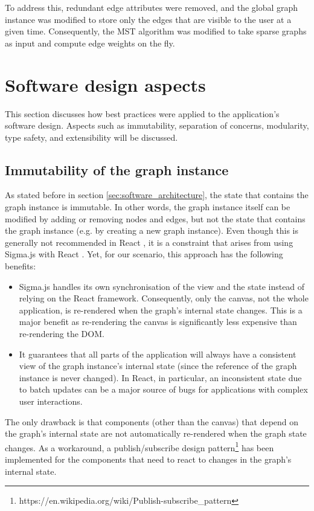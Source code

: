 \documentclass{l4proj}
\begin{document}
To address this, redundant edge attributes were removed, and the global graph instance was modified to store only the edges that are visible to the user at a given time.
Consequently, the MST algorithm was modified to take sparse graphs as input and compute edge weights on the fly.

\section{Software design aspects}
This section discusses how best practices were applied to the application's software design. Aspects such as immutability, separation of concerns, modularity, type safety, and extensibility will be discussed.
\subsection{Immutability of the graph instance}
\label{sec:immutability}
As stated before in section \ref{sec:software_architecture}, the state that contains the graph instance is immutable. In other words, the graph instance itself can be modified by adding or removing nodes and edges, but not the state that contains the graph instance (e.g. by creating a new graph instance).
Even though this is generally not recommended in React \citep{React_update_object_state}, it is a constraint that arises from using Sigma.js with React \citep{React_sigma_js}. Yet, for our scenario, this approach has the following benefits:
\begin{itemize}
    \item Sigma.js handles its own synchronisation of the view and the state instead of relying on the React framework. Consequently, only the canvas, not the whole application, is re-rendered when the graph's internal state changes. This is a major benefit as re-rendering the canvas is significantly less expensive than re-rendering the DOM.
    \item It guarantees that all parts of the application will always have a consistent view of the graph instance's internal state (since the reference of the graph instance is never changed). In React, in particular, an inconsistent state due to batch updates can be a major source of bugs for applications with complex user interactions.
\end{itemize}

The only drawback is that components (other than the canvas) that depend on the graph's internal state are not automatically re-rendered when the graph state changes. As a workaround, a publish/subscribe design pattern\footnote{https://en.wikipedia.org/wiki/Publish-subscribe\_pattern} has been implemented for the components that need to react to changes in the graph's internal state.
\end{document}
